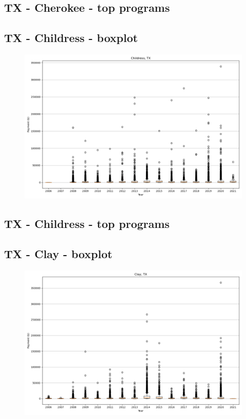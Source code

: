 \subsection*{TX - Cherokee - top programs}

\newpage
\subsection*{TX - Childress - boxplot}
\begin{figure}[h]
\centering
\includegraphics[width=7in]{../output/boxplots/counties/Childress-TX_boxplot.png}
\end{figure}


\subsection*{TX - Childress - top programs}

\newpage
\subsection*{TX - Clay - boxplot}
\begin{figure}[h]
\centering
\includegraphics[width=7in]{../output/boxplots/counties/Clay-TX_boxplot.png}
\end{figure}


